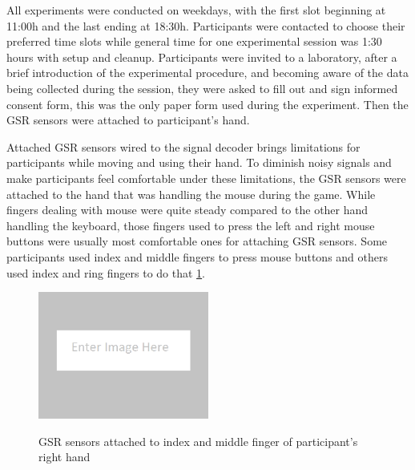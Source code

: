 \documentclass{uofsthesis-cs}
\begin{document}
All experiments were conducted on weekdays, with the first slot beginning at 11:00h and the last ending at 18:30h. Participants were contacted to choose their preferred time slots while general time for one experimental session was 1:30 hours with setup and cleanup. Participants were invited to a laboratory, after a brief introduction of the experimental procedure, and becoming aware of the data being collected during the session, they were asked to fill out and sign informed consent form, this was the only paper form used during the experiment. Then the GSR sensors were attached to participant's hand.

Attached GSR sensors wired to the signal decoder brings limitations for participants while moving and using their hand. To diminish noisy signals and make participants feel comfortable under these limitations, the GSR sensors were attached to the hand that was handling the mouse during the game. While fingers dealing with mouse were quite steady compared to the other hand handling the keyboard, those fingers used to press the left and right mouse buttons were usually most comfortable ones for attaching GSR sensors. Some participants used index and middle fingers to press mouse buttons and others used index and ring fingers to do that \ref{fig:gsr-attached}.

\begin{figure}[h!]
  \caption[Attaching GSR sensors]
  {GSR sensors attached to index and middle finger of participant's right hand}
  \centering
  \includegraphics[width=0.5\textwidth]{images/placeholder.png}
  \label{fig:gsr-attached}
\end{figure}
\end{document}
